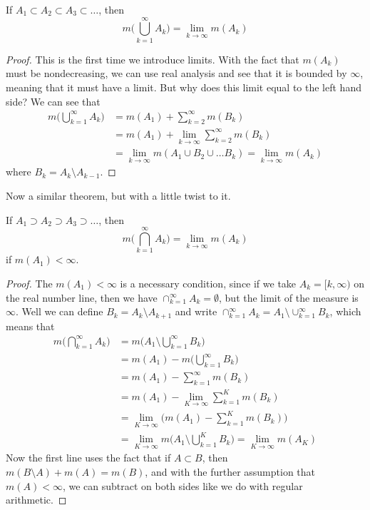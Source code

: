   \begin{theorem}
    If $A_1 \subset A_2 \subset A_3 \subset \ldots$, then 
    \begin{equation}
      m\bigg( \bigcup_{k=1}^\infty A_k \bigg) = \lim_{k \rightarrow \infty} m(A_k)
    \end{equation}
  \end{theorem}
  \begin{proof}
    This is the first time we introduce limits. With the fact that $m(A_k)$ must be nondecreasing, we can use real analysis and see that it is bounded by $\infty$, meaning that it must have a limit. But why does this limit equal to the left hand side? We can see that 
    \begin{align}
      m\bigg( \bigcup_{k=1}^\infty A_k \bigg) & = m(A_1) + \sum_{k=2}^\infty m(B_k) \\
      & = m(A_1) + \lim_{k \rightarrow \infty} \sum_{k=2}^\infty m(B_k) \\
      & = \lim_{k \rightarrow \infty} m(A_1 \cup B_2 \cup \ldots B_k)  = \lim_{k \rightarrow \infty} m(A_k) 
    \end{align}
    where $B_k = A_k \setminus A_{k-1}$. 
  \end{proof}

  Now a similar theorem, but with a little twist to it. 

  \begin{theorem}
    If $A_1 \supset A_2 \supset A_3 \supset \ldots$, then 
    \begin{equation}
      m\bigg( \bigcap_{k=1}^\infty A_k \bigg) = \lim_{k \rightarrow \infty} m(A_k)
    \end{equation}
    if $m(A_1) < \infty$. 
  \end{theorem}
  \begin{proof}
    The $m(A_1) < \infty$ is a necessary condition, since if we take $A_k = [k, \infty)$ on the real number line, then we have $\cap_{k=1}^\infty A_k = \emptyset$, but the limit of the measure is $\infty$. Well we can define $B_k = A_k \setminus A_{k+1}$ and write $\cap_{k=1}^\infty A_k = A_1 \setminus \cup_{k=1}^\infty B_k$, which means that 
    \begin{align*}
      m\bigg( \bigcap_{k=1}^\infty A_k \bigg) & = m\bigg( A_1 \setminus \bigcup_{k=1}^\infty B_k \bigg) \\
      & = m(A_1) - m\bigg( \bigcup_{k=1}^\infty B_k\bigg) \\
      & = m(A_1) - \sum_{k=1}^\infty m(B_k) \\
      & = m(A_1) - \lim_{K \rightarrow \infty} \sum_{k=1}^K m(B_k) \\
      & = \lim_{K \rightarrow \infty} \bigg( m(A_1) - \sum_{k=1}^K m(B_k) \bigg) \\
      & = \lim_{K \rightarrow \infty} m \bigg( A_1 \setminus \bigcup_{k=1}^K B_k \bigg) = \lim_{K \rightarrow \infty} m(A_K)
    \end{align*}
    Now the first line uses the fact that if $A \subset B$, then $m(B \setminus A) + m(A) = m(B)$, and with the further assumption that $m(A) < \infty$, we can subtract on both sides like we do with regular arithmetic. 
  \end{proof}

